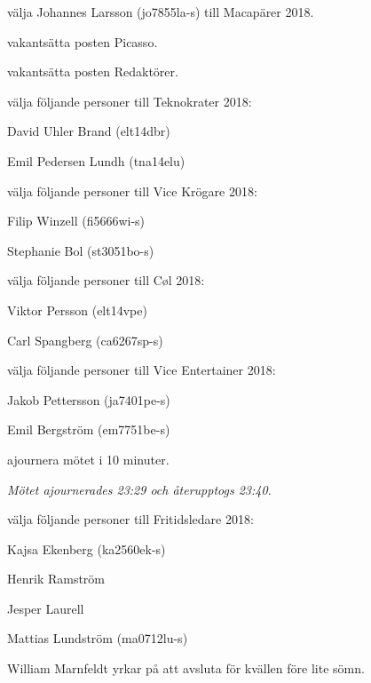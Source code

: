 \documentclass[10pt]{article}
\begin{document}
\begin{paragrafer}
\begin{paralist}
    \Mba välja Johannes Larsson (jo7855la-s) till Macapärer 2018.

    \Mba vakantsätta posten Picasso.

    \Mba vakantsätta posten Redaktörer.

    \Mba välja följande personer till Teknokrater 2018:
    \begin{tightdashlist}
        \item David Uhler Brand (elt14dbr)
        \item Emil Pedersen Lundh (tna14elu)
    \end{tightdashlist}

    \Mba välja följande personer till Vice Krögare 2018:
    \begin{tightdashlist}
        \item Filip Winzell (fi5666wi-s)
        \item Stephanie Bol (st3051bo-s)
    \end{tightdashlist}

    \Mba välja följande personer till Cøl 2018:
    \begin{tightdashlist}
        \item Viktor Persson (elt14vpe)
        \item Carl Spangberg (ca6267sp-s)
    \end{tightdashlist}

    \Mba välja följande personer till Vice Entertainer 2018:
    \begin{tightdashlist}
        \item Jakob Pettersson (ja7401pe-s)
        \item Emil Bergström (em7751be-s)
    \end{tightdashlist}

    \Mba ajournera mötet i 10 minuter.

    \emph{Mötet ajournerades 23:29 och återupptogs 23:40.}

    \Mba välja följande personer till Fritidsledare 2018:
    \begin{tightdashlist}
        \item Kajsa Ekenberg (ka2560ek-s)
        \item Henrik Ramström
        \item Jesper Laurell
        \item Mattias Lundström (ma0712lu-s)
    \end{tightdashlist}

    William Marnfeldt yrkar på att avsluta för kvällen före lite sömn.


\end{paralist}
\end{paragrafer}
\end{document}
